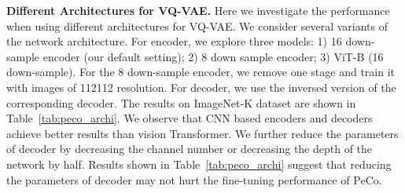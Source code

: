 \documentclass[letterpaper]{article} \usepackage{aaai23}  \usepackage{times}  \usepackage{helvet}  \usepackage{courier}  \usepackage[hyphens]{url}  \usepackage{graphicx} \urlstyle{rm} \def\UrlFont{\rm}  \usepackage{natbib}  \usepackage{caption} \frenchspacing  \setlength{\pdfpagewidth}{8.5in}  \setlength{\pdfpageheight}{11in}  \usepackage{algorithm}
\begin{document}
\begin{table}[h]
\centering
{}
\caption{Adversarial robustness analysis on different self-learning methods.}
 
\label{tbl:cls:adversarial}
\end{table}





\noindent \textbf{Different Architectures for VQ-VAE.}
Here we investigate the performance when using different architectures for VQ-VAE.
We consider several variants of the network architecture. 
For encoder, we explore three models: 1) 16 down-sample encoder (our default setting); 2) 8 down sample encoder; 3) ViT-B (16 down-sample). For the 8 down-sample encoder, we remove one stage and train it with images of 112112 resolution. 
For decoder, we  use the inversed version of the corresponding decoder.
The results on ImageNet-K dataset are shown in Table~\ref{tab:peco_archi}. We observe that CNN based encoders and decoders achieve better results than vision Transformer. 
We further reduce the parameters of decoder by decreasing the channel number or decreasing the depth of the network by half. 
Results shown in Table~\ref{tab:peco_archi} suggest that reducing the parameters of decoder may not hurt the fine-tuning performance of PeCo.
\end{document}
